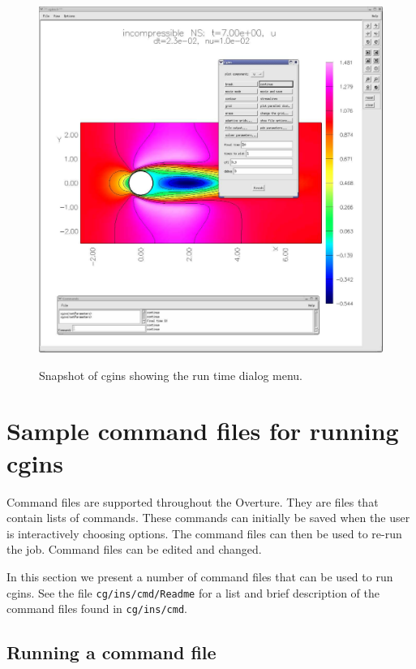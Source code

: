 \documentclass{article}
\newcommand{\Index}[1]{#1\index{#1}}
\begin{document}
  
\begin{figure}[hbt]
\begin{center}
  \includegraphics[width=.75\linewidth]{cginsScreen} \\
  \caption{Snapshot of cgins showing the run time dialog menu. }
  \end{center} 
  \label{fig:runTimeScreen}
\end{figure}

\clearpage
\section{Sample command files for running cgins} \label{sec:demo}

Command files are supported throughout the Overture. They are files
that contain lists of commands. These commands can initially be saved
when the user is interactively choosing options.  The \Index{command files}
can then be used to re-run the job. Command files can be edited and
changed.

In this section we present a number of command files that can be used
to run cgins. See the file {\tt cg/ins/cmd/Readme} for a list and brief description of
the command files found in {\tt cg/ins/cmd}. 

\subsection{Running a command file}
\end{document}
